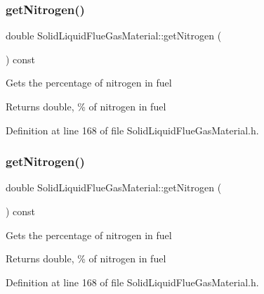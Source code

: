 \subsubsection{\texorpdfstring{get\+Nitrogen()}{getNitrogen()}\hspace{0.1cm}{\footnotesize\ttfamily [2/3]}}
{\footnotesize\ttfamily double Solid\+Liquid\+Flue\+Gas\+Material\+::get\+Nitrogen (\begin{DoxyParamCaption}{ }\end{DoxyParamCaption}) const\hspace{0.3cm}{\ttfamily [inline]}}

Gets the percentage of nitrogen in fuel \begin{DoxyReturn}{Returns}
double, \% of nitrogen in fuel 
\end{DoxyReturn}


Definition at line 168 of file Solid\+Liquid\+Flue\+Gas\+Material.\+h.

\mbox{\label{class_solid_liquid_flue_gas_material_a76159a5d9d609f0e0131f7bca3b60ebc}} 
\subsubsection{\texorpdfstring{get\+Nitrogen()}{getNitrogen()}\hspace{0.1cm}{\footnotesize\ttfamily [3/3]}}
{\footnotesize\ttfamily double Solid\+Liquid\+Flue\+Gas\+Material\+::get\+Nitrogen (\begin{DoxyParamCaption}{ }\end{DoxyParamCaption}) const\hspace{0.3cm}{\ttfamily [inline]}}

Gets the percentage of nitrogen in fuel \begin{DoxyReturn}{Returns}
double, \% of nitrogen in fuel 
\end{DoxyReturn}


Definition at line 168 of file Solid\+Liquid\+Flue\+Gas\+Material.\+h.

\mbox{\label{class_solid_liquid_flue_gas_material_a08d588e576f605d3f9925cb649e1105e}} 
